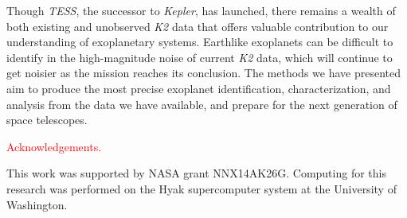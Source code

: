 \documentclass[12pt,preprint]{aastex}
\begin{document}
Though \textit{TESS}, the successor to \textit{Kepler}, has launched, there remains a wealth of both existing and unobserved \textit{K2} data that offers valuable contribution to our understanding of exoplanetary systems. Earthlike exoplanets can be difficult to identify in the high-magnitude noise of current \textit{K2} data, which will continue to get noisier as the mission reaches its conclusion. The methods we have presented aim to produce the most precise exoplanet identification, characterization, and analysis from the data we have available, and prepare for the next generation of space telescopes.

\textcolor{red}{Acknowledgements.}

This work was supported by NASA grant NNX14AK26G. Computing for this research was performed on the Hyak supercomputer system at the University of Washington.

\clearpage


\end{document}
